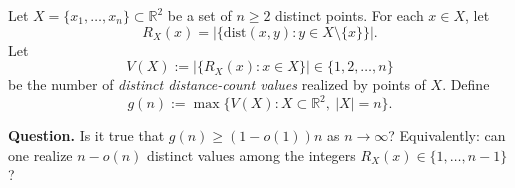 Let $X=\{x_1,\dots,x_n\}\subset\mathbb{R}^2$ be a set of $n\ge 2$ distinct points.
For each $x\in X$, let
\[
R_X(x)=\left\lvert \{\mathrm{dist}(x,y):y\in X\setminus\{x\}\} \right\rvert.
\]
Let
\[
V(X):=\left\lvert \{R_X(x):x\in X\} \right\rvert\in\{1,2,\dots,n\}
\]
be the number of \emph{distinct distance-count values} realized by points of $X$.
Define
\[
 g(n):=\max\{V(X):X\subset\mathbb{R}^2,\ \left\lvert X \right\rvert=n\}.
\]

\medskip
\noindent
\textbf{Question.} Is it true that $g(n)\ge (1-o(1))n$ as $n\to\infty$?
Equivalently: can one realize $n-o(n)$ distinct values among the integers $R_X(x)\in\{1,\dots,n-1\}$?
